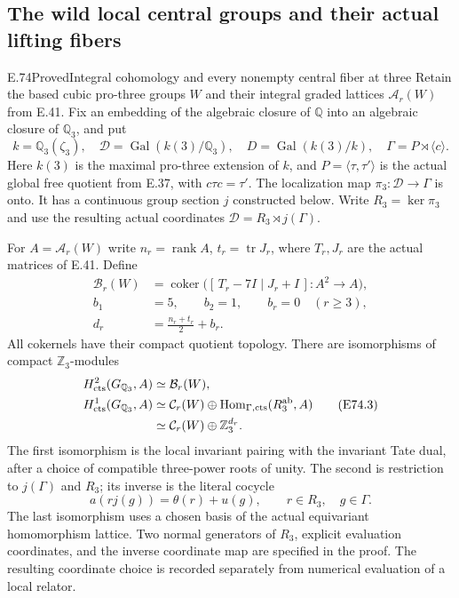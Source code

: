 \subsection{The wild local central groups and their actual lifting fibers}

\begin{statement}{E.74}{Proved}{Integral cohomology and every nonempty central fiber at three}
Retain the based cubic pro-three groups $W$ and their integral
graded lattices $\mathcal A_r(W)$ from E.41. Fix an embedding
of the algebraic closure of $\mathbb Q$ into an algebraic
closure of $\mathbb Q_3$, and put
\[
 k=\mathbb Q_3(\zeta_3),\quad
 \mathcal D=\operatorname{Gal}(k(3)/\mathbb Q_3),\quad
 D=\operatorname{Gal}(k(3)/k),\quad
 \Gamma=P\rtimes\langle c\rangle.
 \tag{E74.1}
\]
Here $k(3)$ is the maximal pro-three extension of $k$, and
$P=\langle\tau,\tau'\rangle$ is the actual global free
quotient from E.37, with $c\tau c=\tau'$. The localization
map $\pi_3:\mathcal D\to\Gamma$ is onto. It has a
continuous group section $j$ constructed below. Write
$R_3=\ker\pi_3$ and use the resulting actual coordinates
$\mathcal D=R_3\rtimes j(\Gamma)$.

For $A=\mathcal A_r(W)$ write $n_r=\operatorname{rank}A$,
$t_r=\operatorname{tr}J_r$, where $T_r,J_r$ are the
actual matrices of E.41. Define
\[
 \begin{split}
 \mathcal B_r(W)
   &=\operatorname{coker}\bigl(
       [\,T_r-7I\mid J_r+I\,]:A^2\longrightarrow A\bigr),\\
 b_1&=5,\qquad b_2=1,\qquad b_r=0\quad(r\ge3),\\
 d_r&=\frac{n_r+t_r}{2}+b_r.
 \end{split}
 \tag{E74.2}
\]
All cokernels have their compact quotient topology. There
are isomorphisms of compact $\mathbb Z_3$-modules
\[
 \begin{split}
 H^2_{\rm cts}(G_{\mathbb Q_3},A)&\simeq\mathcal B_r(W),\\
 H^1_{\rm cts}(G_{\mathbb Q_3},A)
   &\simeq\mathcal C_r(W)\oplus
       \operatorname{Hom}_{\Gamma,\rm cts}(R_3^{\rm ab},A)\\
   &\simeq\mathcal C_r(W)\oplus\mathbb Z_3^{d_r}.
 \end{split}
 \tag{E74.3}
\]
The first isomorphism is the local invariant pairing with
the invariant Tate dual, after a choice of compatible
three-power roots of unity. The second is restriction to
$j(\Gamma)$ and $R_3$; its inverse is the literal cocycle
\[
 a(rj(g))=\theta(r)+u(g),\qquad
 r\in R_3,\quad g\in\Gamma.
 \tag{E74.4}
\]
The last isomorphism uses a chosen basis of the actual
equivariant homomorphism lattice. Two normal generators
of $R_3$, explicit evaluation coordinates, and the inverse
coordinate map are specified in the proof. The resulting
coordinate choice is recorded separately from numerical
evaluation of a local relator.


\end{statement}
